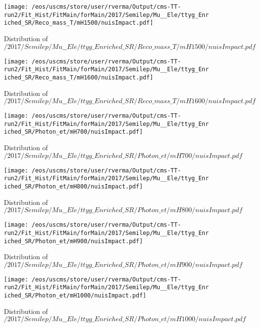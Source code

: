 \begin{figure}
\centering
\texttt{[image: /eos/uscms/store/user/rverma/Output/cms-TT-run2/Fit\_Hist/FitMain/forMain/2017/Semilep/Mu\_\_Ele/ttyg\_Enriched\_SR/Reco\_mass\_T/mH1500/nuisImpact.pdf]}
\caption{Distribution of $/2017/Semilep/Mu\_\_Ele/ttyg\_Enriched\_SR/Reco\_mass\_T/mH1500/nuisImpact.pdf$}
\end{figure}

\begin{figure}
\centering
\texttt{[image: /eos/uscms/store/user/rverma/Output/cms-TT-run2/Fit\_Hist/FitMain/forMain/2017/Semilep/Mu\_\_Ele/ttyg\_Enriched\_SR/Reco\_mass\_T/mH1600/nuisImpact.pdf]}
\caption{Distribution of $/2017/Semilep/Mu\_\_Ele/ttyg\_Enriched\_SR/Reco\_mass\_T/mH1600/nuisImpact.pdf$}
\end{figure}

\begin{figure}
\centering
\texttt{[image: /eos/uscms/store/user/rverma/Output/cms-TT-run2/Fit\_Hist/FitMain/forMain/2017/Semilep/Mu\_\_Ele/ttyg\_Enriched\_SR/Photon\_et/mH700/nuisImpact.pdf]}
\caption{Distribution of $/2017/Semilep/Mu\_\_Ele/ttyg\_Enriched\_SR/Photon\_et/mH700/nuisImpact.pdf$}
\end{figure}

\begin{figure}
\centering
\texttt{[image: /eos/uscms/store/user/rverma/Output/cms-TT-run2/Fit\_Hist/FitMain/forMain/2017/Semilep/Mu\_\_Ele/ttyg\_Enriched\_SR/Photon\_et/mH800/nuisImpact.pdf]}
\caption{Distribution of $/2017/Semilep/Mu\_\_Ele/ttyg\_Enriched\_SR/Photon\_et/mH800/nuisImpact.pdf$}
\end{figure}

\begin{figure}
\centering
\texttt{[image: /eos/uscms/store/user/rverma/Output/cms-TT-run2/Fit\_Hist/FitMain/forMain/2017/Semilep/Mu\_\_Ele/ttyg\_Enriched\_SR/Photon\_et/mH900/nuisImpact.pdf]}
\caption{Distribution of $/2017/Semilep/Mu\_\_Ele/ttyg\_Enriched\_SR/Photon\_et/mH900/nuisImpact.pdf$}
\end{figure}

\begin{figure}
\centering
\texttt{[image: /eos/uscms/store/user/rverma/Output/cms-TT-run2/Fit\_Hist/FitMain/forMain/2017/Semilep/Mu\_\_Ele/ttyg\_Enriched\_SR/Photon\_et/mH1000/nuisImpact.pdf]}
\caption{Distribution of $/2017/Semilep/Mu\_\_Ele/ttyg\_Enriched\_SR/Photon\_et/mH1000/nuisImpact.pdf$}
\end{figure}


